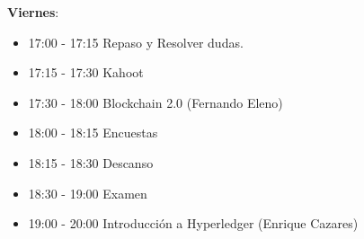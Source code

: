\documentclass[a4paper,12pt]{/home/armando/Documentos/Cursos/LaTeX/Plantillas/lib/pub}
\begin{document}
\textbf{Viernes}:
\begin{itemize}
	\item 17:00 - 17:15 Repaso y Resolver dudas.
	\item 17:15 - 17:30 Kahoot
	\item 17:30 - 18:00 Blockchain 2.0 (Fernando Eleno)
	\item 18:00 - 18:15 Encuestas
	\item 18:15 - 18:30 Descanso
	\item 18:30 - 19:00 Examen
	\item 19:00 - 20:00 Introducción a Hyperledger (Enrique Cazares)
\end{itemize}
\end{document}
